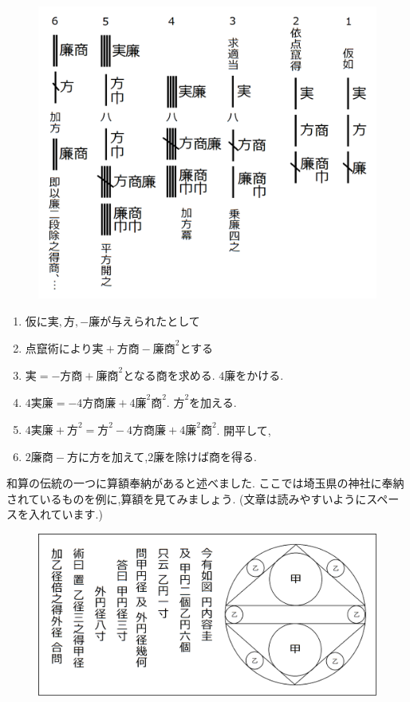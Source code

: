 \documentclass[./main]{subfiles}
\begin{document}
\begin{figure}[H]
\begin{center}
\includegraphics[width=13cm,bb=0 0 1142 986]{ookuwa2.png}
\end{center}
\end{figure}

\begin{enumerate}
\item 仮に$実,方,-廉$が与えられたとして
\item 点竄術により$実+方商-廉商^2$とする
\item $実=-方商+廉商^2$となる商を求める. $4廉$をかける.
\item $4実廉=-4方商廉+4 廉^2 商^2$. $方^2$を加える.
\item $4実廉+方^2 = 方^2 - 4方商廉 + 4 廉^2 商^2$. 開平して,
\item $2廉商-方$に方を加えて,$2廉$を除けば商を得る.
\end{enumerate}



和算の伝統の一つに算額奉納があると述べました. ここでは埼玉県の神社に奉納されているものを例に,算額を見てみましょう. (文章は読みやすいようにスペースを入れています.)

\begin{figure}[H]
\begin{center}
\includegraphics[width=13cm,bb=0 0 1926 922]{ookuwa3.png}
\end{center}
\end{figure}
\end{document}
